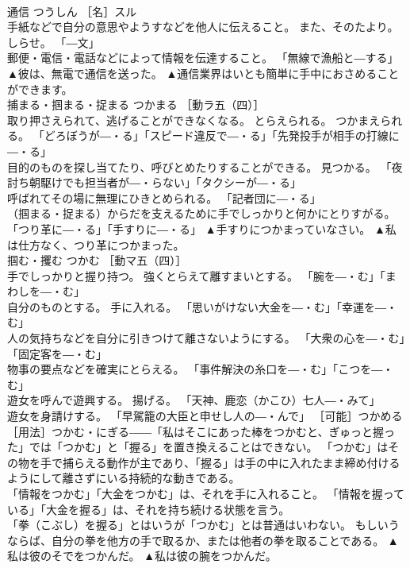 \documentclass[8pt]{extreport}
\begin{document}
\begin{CJK}{UTF8}{min}
\\	通信	つうしん	［名］スル 
\\	手紙などで自分の意思やようすなどを他人に伝えること。 また、そのたより。 しらせ。 「―文」 
\\	郵便・電信・電話などによって情報を伝達すること。 「無線で漁船と―する」	▲彼は、無電で通信を送った。 ▲通信業界はいとも簡単に手中におさめることができます。
\\	捕まる・掴まる・捉まる	つかまる	［動ラ五（四）］ 
\\	取り押さえられて、逃げることができなくなる。 とらえられる。 つかまえられる。 「どろぼうが―・る」「スピード違反で―・る」「先発投手が相手の打線に―・る」 
\\	目的のものを探し当てたり、呼びとめたりすることができる。 見つかる。 「夜討ち朝駆けでも担当者が―・らない」「タクシーが―・る」 
\\	呼ばれてその場に無理にひきとめられる。 「記者団に―・る」 
\\	（掴まる・捉まる）からだを支えるために手でしっかりと何かにとりすがる。 「つり革に―・る」「手すりに―・る」	▲手すりにつかまっていなさい。 ▲私は仕方なく、つり革につかまった。
\\	掴む・攫む	つかむ	［動マ五（四）］ 
\\	手でしっかりと握り持つ。 強くとらえて離すまいとする。 「腕を―・む」「まわしを―・む」 
\\	自分のものとする。 手に入れる。 「思いがけない大金を―・む」「幸運を―・む」 
\\	人の気持ちなどを自分に引きつけて離さないようにする。 「大衆の心を―・む」「固定客を―・む」 
\\	物事の要点などを確実にとらえる。 「事件解決の糸口を―・む」「こつを―・む」 
\\	遊女を呼んで遊興する。 揚げる。 「天神、鹿恋（かこひ）七人―・みて」 
\\	遊女を身請けする。 「早駕籠の大臣と申せし人の―・んで」 ［可能］つかめる ［用法］つかむ・にぎる――「私はそこにあった棒をつかむと、ぎゅっと握った」では「つかむ」と「握る」を置き換えることはできない。 「つかむ」はその物を手で捕らえる動作が主であり、「握る」は手の中に入れたまま締め付けるようにして離さずにいる持続的な動きである。 
\\	「情報をつかむ」「大金をつかむ」は、それを手に入れること。 「情報を握っている」「大金を握る」は、それを持ち続ける状態を言う。 
\\	「拳（こぶし）を握る」とはいうが「つかむ」とは普通はいわない。 もしいうならば、自分の拳を他方の手で取るか、または他者の拳を取ることである。	▲私は彼のそでをつかんだ。 ▲私は彼の腕をつかんだ。

\end{CJK}
\end{document}
